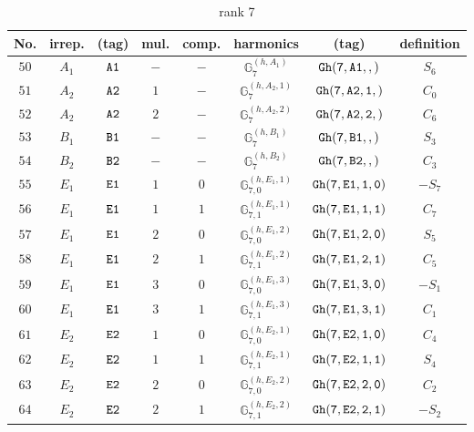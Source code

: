 \documentclass[fleqn,8pt]{jsarticle}
\begin{document}
\begin{table}[ht!]
\begin{center}
\caption{rank 7}
\renewcommand{\arraystretch}{1.3}
\begin{tabular}{cccccccc} \hline \hline
No. & irrep. & (tag) & mul. & comp. & harmonics & (tag) & definition \\ \hline
$ 50 $ & $ A_{1} $ & $ {\tt A1} $ & $ - $ & $ - $ & $ \mathbb{G}_{7}^{(h,A_{1})} $ & $ {\tt Gh(7,A1,,)} $ & $ S_{6} $ \\
$ 51 $ & $ A_{2} $ & $ {\tt A2} $ & $ 1 $ & $ - $ & $ \mathbb{G}_{7}^{(h,A_{2},1)} $ & $ {\tt Gh(7,A2,1,)} $ & $ C_{0} $ \\
$ 52 $ & $ A_{2} $ & $ {\tt A2} $ & $ 2 $ & $ - $ & $ \mathbb{G}_{7}^{(h,A_{2},2)} $ & $ {\tt Gh(7,A2,2,)} $ & $ C_{6} $ \\
$ 53 $ & $ B_{1} $ & $ {\tt B1} $ & $ - $ & $ - $ & $ \mathbb{G}_{7}^{(h,B_{1})} $ & $ {\tt Gh(7,B1,,)} $ & $ S_{3} $ \\
$ 54 $ & $ B_{2} $ & $ {\tt B2} $ & $ - $ & $ - $ & $ \mathbb{G}_{7}^{(h,B_{2})} $ & $ {\tt Gh(7,B2,,)} $ & $ C_{3} $ \\
$ 55 $ & $ E_{1} $ & $ {\tt E1} $ & $ 1 $ & $ 0 $ & $ \mathbb{G}_{7,0}^{(h,E_{1},1)} $ & $ {\tt Gh(7,E1,1,0)} $ & $ - S_{7} $ \\
$ 56 $ & $ E_{1} $ & $ {\tt E1} $ & $ 1 $ & $ 1 $ & $ \mathbb{G}_{7,1}^{(h,E_{1},1)} $ & $ {\tt Gh(7,E1,1,1)} $ & $ C_{7} $ \\
$ 57 $ & $ E_{1} $ & $ {\tt E1} $ & $ 2 $ & $ 0 $ & $ \mathbb{G}_{7,0}^{(h,E_{1},2)} $ & $ {\tt Gh(7,E1,2,0)} $ & $ S_{5} $ \\
$ 58 $ & $ E_{1} $ & $ {\tt E1} $ & $ 2 $ & $ 1 $ & $ \mathbb{G}_{7,1}^{(h,E_{1},2)} $ & $ {\tt Gh(7,E1,2,1)} $ & $ C_{5} $ \\
$ 59 $ & $ E_{1} $ & $ {\tt E1} $ & $ 3 $ & $ 0 $ & $ \mathbb{G}_{7,0}^{(h,E_{1},3)} $ & $ {\tt Gh(7,E1,3,0)} $ & $ - S_{1} $ \\
$ 60 $ & $ E_{1} $ & $ {\tt E1} $ & $ 3 $ & $ 1 $ & $ \mathbb{G}_{7,1}^{(h,E_{1},3)} $ & $ {\tt Gh(7,E1,3,1)} $ & $ C_{1} $ \\
$ 61 $ & $ E_{2} $ & $ {\tt E2} $ & $ 1 $ & $ 0 $ & $ \mathbb{G}_{7,0}^{(h,E_{2},1)} $ & $ {\tt Gh(7,E2,1,0)} $ & $ C_{4} $ \\
$ 62 $ & $ E_{2} $ & $ {\tt E2} $ & $ 1 $ & $ 1 $ & $ \mathbb{G}_{7,1}^{(h,E_{2},1)} $ & $ {\tt Gh(7,E2,1,1)} $ & $ S_{4} $ \\
$ 63 $ & $ E_{2} $ & $ {\tt E2} $ & $ 2 $ & $ 0 $ & $ \mathbb{G}_{7,0}^{(h,E_{2},2)} $ & $ {\tt Gh(7,E2,2,0)} $ & $ C_{2} $ \\
$ 64 $ & $ E_{2} $ & $ {\tt E2} $ & $ 2 $ & $ 1 $ & $ \mathbb{G}_{7,1}^{(h,E_{2},2)} $ & $ {\tt Gh(7,E2,2,1)} $ & $ - S_{2} $ \\
 \hline \hline
\end{tabular}
\end{center}
\end{table}
\end{document}

